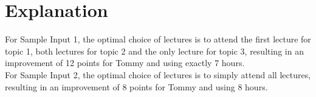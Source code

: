 \section*{Explanation}
{
\noindent For Sample Input 1, the optimal choice of lectures is to attend the first lecture for topic 1, both lectures for topic 2 and the only lecture for topic 3, resulting in an improvement of 12 points for Tommy and using exactly 7 hours.\\

\noindent For Sample Input 2, the optimal choice of lectures is to simply attend all lectures, resulting in an improvement of 8 points for Tommy and using 8 hours.\\
} 
